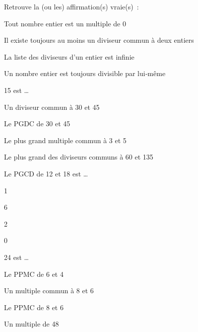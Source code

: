 \begin{QCM}
\begin{GroupeQCM}
    \begin{exercice}
      Retrouve la (ou les) affirmation(s) vraie(s) :
      \begin{ChoixQCM}{4}
      \item Tout nombre entier est un multiple de 0
      \item Il existe toujours au moins un diviseur commun à deux entiers
      \item La liste des diviseurs d'un entier est infinie
      \item Un nombre entier est toujours divisible par lui‑même
      \end{ChoixQCM}
\begin{corrige}
   \end{corrige}
    \end{exercice}
    
    \begin{exercice}
      15 est \ldots
      \begin{ChoixQCM}{4}
      \item Un diviseur commun à 30 et 45
      \item Le PGDC de 30 et 45
      \item Le plus grand multiple commun à 3 et 5
      \item Le plus grand des diviseurs communs à 60 et 135
      \end{ChoixQCM}
\begin{corrige}
   \end{corrige}
    \end{exercice}
    
    \begin{exercice}
      Le PGCD de 12 et 18 est \ldots
      \begin{ChoixQCM}{4}
      \item 1
      \item 6
      \item 2
      \item 0
      \end{ChoixQCM}
\begin{corrige}
   \end{corrige}
    \end{exercice}

    \begin{exercice}
      24 est \ldots
      \begin{ChoixQCM}{4}
      \item Le PPMC de 6 et 4
      \item Un multiple commun à 8 et 6 
      \item Le PPMC de 8 et 6
      \item Un multiple de 48
      \end{ChoixQCM}
\begin{corrige}
   \end{corrige}
    \end{exercice}
   
\end{GroupeQCM}
\end{QCM}


